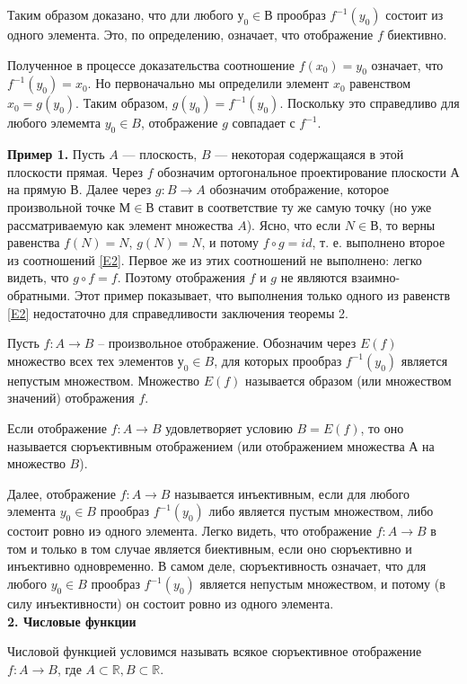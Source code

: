 \documentclass{article}
\begin{document}
\par Таким образом доказано, что дли любого $у_0\in В$ прообраз $f^{-1}(y_0)$ состоит из одного элемента. Это, по определению, означает, что отображение $f$ биективно.
\par Полученное в процессе доказательства соотношение $f(x_0)=y_0$ означает, что $f^{-1}(y_0)=x_0$. Но первоначально мы определили элемент $x_0$ равенством $x_0=g(y_0)$. Таким образом, $g(y_0)=f^{-1}(y_0)$. Поскольку это справедливо для любого элемемта $y_0\in B$, отображение $g$ совпадает с $f^{-1}$.
\par \textbf{Пример 1.} Пусть $A$ — плоскость, $B$ — некоторая содержащаяся в этой плоскости прямая. Через $f$ обозначим ортогональное проектирование плоскости $А$ на прямую $В$. Далее через $g\colon B\to A$ обозначим отображение, которое произвольной точке $М\in В$ ставит в соответствие ту же самую точку (но уже рассматриваемую как элемент множества $A$). Ясно, что если $N\in В$, то верны равенства $f(N)=N$, $g(N)=N$, и потому $f\circ g=id$, т. е. выполнено второе из соотношений \eqref{E2}. Первое же из этих соотношений не выполнено:	легко видеть, что $g\circ f=f$. Поэтому отображения $f$ и $g$ не являются взаимно-обратными. Этот пример показывает, что выполнения только одного из равенств \eqref{E2} недостаточно для справедливости заключения теоремы 2.
\par Пусть $f\colon A\to B$ -- произвольное отображение. Обозначим через $E(f)$ множество всех тех элементов $у_0\in B$, для которых прообраз $f^{-1}(y_0)$ является непустым множеством. Множество $E(f)$ называется образом (или множеством значений) отображения $f$.
\par Если отображение $f\colon A\to B$ удовлетворяет условию $B=E(f)$, то оно называется сюръективным отображением (или отображением множества $А$ на множество $B$).
\par Далее, отображение $f\colon A\to B$ называется инъективным, если для любого элемента $y_0\in B$ прообраз $f^{-1}(y_0)$ либо является пустым множеством, либо состоит ровно иэ одного элемента. Легко видеть, что отображение $f\colon A\to B$ в том и только в том случае является биективным, если оно сюръективно и инъективно одновременно. В самом деле, сюръективность означает, что для любого $y_0\in B$ прообраз $f^{-1}(y_0)$ является непустым множеством, и потому (в силу инъективности) он состоит ровно из одного элемента.
\\\textbf{2. Числовые функции}
\par Числовой функцией условимся называть всякое сюръективное отображение $f\colon A\to B$, где $A\subset\mathbb{R},B\subset \mathbb{R}$.
\end{document}
